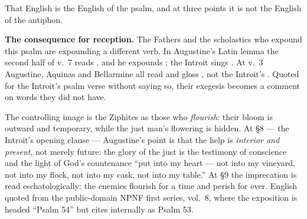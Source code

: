 That English is the English of the psalm, and at three points it is not the
English of the antiphon.


\textbf{The consequence for reception.} The Fathers and
the scholastics who expound this psalm are expounding a different verb. In
Augustine's Latin lemma the second half of v.~7 reads , and he expounds ; the Introit sings . At v.~3 Augustine, Aquinas and Bellarmine all read and gloss
, not the Introit's . Quoted for the
Introit's psalm verse without saying so, their exegesis becomes a comment on
words they did not have.

\begin{witnessnote}
The controlling image is the Ziphites as those who \textit{flourish}: their
bloom is outward and temporary, while the just man's flowering is hidden. At
§8 --- the Introit's opening clause --- Augustine's point is that the help is
\textit{interior and present}, not merely future: the glory of the just is the
testimony of conscience and the light of God's countenance ``put into my
heart --- not into my vineyard, not into my flock, not into my cask, not into
my table.'' At §9 the imprecation is read eschatologically: the enemies
flourish for a time and perish for ever. English quoted from the
public-domain NPNF first series, vol.~8, where the exposition is headed
``Psalm 54'' but cites internally as Psalm 53.
\end{witnessnote}


